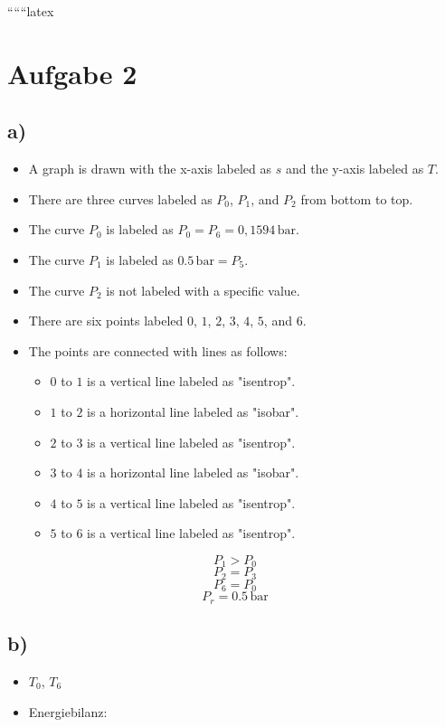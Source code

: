 
``````latex


\section*{Aufgabe 2}

\subsection*{a)}

\begin{itemize}
    \item A graph is drawn with the x-axis labeled as $s$ and the y-axis labeled as $T$.
    \item There are three curves labeled as $P_0$, $P_1$, and $P_2$ from bottom to top.
    \item The curve $P_0$ is labeled as $P_0 = P_6 = 0,1594 \, \text{bar}$.
    \item The curve $P_1$ is labeled as $0.5 \, \text{bar} = P_5$.
    \item The curve $P_2$ is not labeled with a specific value.
    \item There are six points labeled $0$, $1$, $2$, $3$, $4$, $5$, and $6$.
    \item The points are connected with lines as follows:
        \begin{itemize}
            \item $0$ to $1$ is a vertical line labeled as "isentrop".
            \item $1$ to $2$ is a horizontal line labeled as "isobar".
            \item $2$ to $3$ is a vertical line labeled as "isentrop".
            \item $3$ to $4$ is a horizontal line labeled as "isobar".
            \item $4$ to $5$ is a vertical line labeled as "isentrop".
            \item $5$ to $6$ is a vertical line labeled as "isentrop".
        \end{itemize}
\end{itemize}

\[
P_1 > P_0
\]
\[
P_2 = P_3
\]
\[
P_6 = P_0
\]
\[
P_r = 0.5 \, \text{bar}
\]

\subsection*{b)}

\begin{itemize}
    \item $T_0$, $T_6$
    \item Energiebilanz:
\end{itemize}

